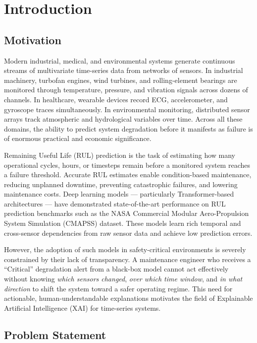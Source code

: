 \chapter{Introduction}

\section{Motivation}

Modern industrial, medical, and environmental systems generate continuous streams of multivariate time-series data from networks of sensors. In industrial machinery, turbofan engines, wind turbines, and rolling-element bearings are monitored through temperature, pressure, and vibration signals across dozens of channels. In healthcare, wearable devices record ECG, accelerometer, and gyroscope traces simultaneously. In environmental monitoring, distributed sensor arrays track atmospheric and hydrological variables over time. Across all these domains, the ability to predict system degradation before it manifests as failure is of enormous practical and economic significance.

Remaining Useful Life (RUL) prediction is the task of estimating how many operational cycles, hours, or timesteps remain before a monitored system reaches a failure threshold. Accurate RUL estimates enable condition-based maintenance, reducing unplanned downtime, preventing catastrophic failures, and lowering maintenance costs. Deep learning models — particularly Transformer-based architectures — have demonstrated state-of-the-art performance on RUL prediction benchmarks such as the NASA Commercial Modular Aero-Propulsion System Simulation (CMAPSS) dataset. These models learn rich temporal and cross-sensor dependencies from raw sensor data and achieve low prediction errors.

However, the adoption of such models in safety-critical environments is severely constrained by their lack of transparency. A maintenance engineer who receives a ``Critical'' degradation alert from a black-box model cannot act effectively without knowing \emph{which sensors changed}, \emph{over which time window}, and \emph{in what direction} to shift the system toward a safer operating regime. This need for actionable, human-understandable explanations motivates the field of Explainable Artificial Intelligence (XAI) for time-series systems.

\section{Problem Statement}

